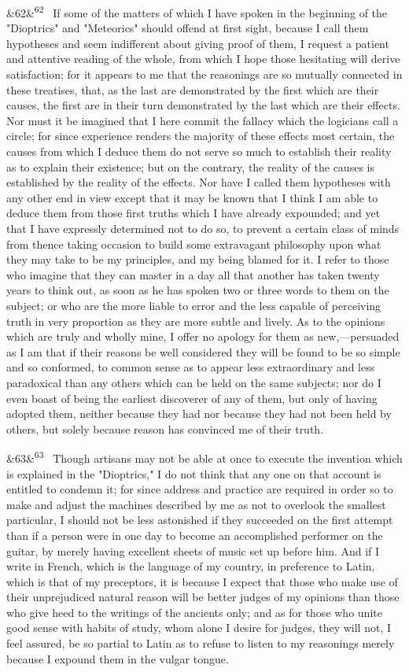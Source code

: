 \documentclass[12pt]{article}
\newcommand{\para}[1][]{\par\noindent\ifx&#1&\else\textsuperscript{\footnotesize #1}~\fi}
\begin{document}
\para[62] If some of the matters of which I have spoken in the beginning of the "Dioptrics" and "Meteorics" should offend at first sight, because I call them hypotheses and seem indifferent about giving proof of them, I request a patient and attentive reading of the whole, from which I hope those hesitating will derive satisfaction; for it appears to me that the reasonings are so mutually connected in these treatises, that, as the last are demonstrated by the first which are their causes, the first are in their turn demonstrated by the last which are their effects. Nor must it be imagined that I here commit the fallacy which the logicians call a circle; for since experience renders the majority of these effects most certain, the causes from which I deduce them do not serve so much to establish their reality as to explain their existence; but on the contrary, the reality of the causes is established by the reality of the effects. Nor have I called them hypotheses with any other end in view except that it may be known that I think I am able to deduce them from those first truths which I have already expounded; and yet that I have expressly determined not to do so, to prevent a certain class of minds from thence taking occasion to build some extravagant philosophy upon what they may take to be my principles, and my being blamed for it. I refer to those who imagine that they can master in a day all that another has taken twenty years to think out, as soon as he has spoken two or three words to them on the subject; or who are the more liable to error and the less capable of perceiving truth in very proportion as they are more subtle and lively. As to the opinions which are truly and wholly mine, I offer no apology for them as new,---persuaded as I am that if their reasons be well considered they will be found to be so simple and so conformed, to common sense as to appear less extraordinary and less paradoxical than any others which can be held on the same subjects; nor do I even boast of being the earliest discoverer of any of them, but only of having adopted them, neither because they had nor because they had not been held by others, but solely because reason has convinced me of their truth.

\para[63] Though artisans may not be able at once to execute the invention which is explained in the "Dioptrics," I do not think that any one on that account is entitled to condemn it; for since address and practice are required in order so to make and adjust the machines described by me as not to overlook the smallest particular, I should not be less astonished if they succeeded on the first attempt than if a person were in one day to become an accomplished performer on the guitar, by merely having excellent sheets of music set up before him. And if I write in French, which is the language of my country, in preference to Latin, which is that of my preceptors, it is because I expect that those who make use of their unprejudiced natural reason will be better judges of my opinions than those who give heed to the writings of the ancients only; and as for those who unite good sense with habits of study, whom alone I desire for judges, they will not, I feel assured, be so partial to Latin as to refuse to listen to my reasonings merely because I expound them in the vulgar tongue.
\end{document}
